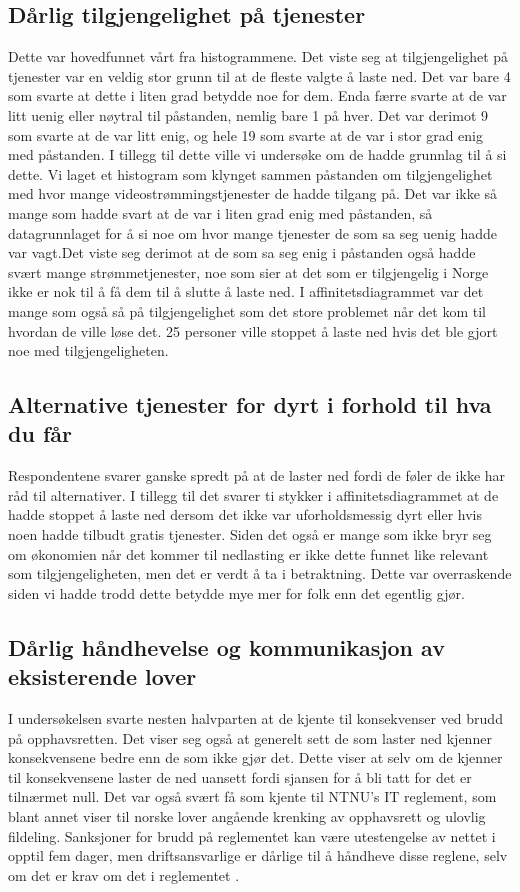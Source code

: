 \subsection{Dårlig tilgjengelighet på tjenester}
Dette var hovedfunnet vårt fra histogrammene. Det viste seg at tilgjengelighet på tjenester var en veldig stor grunn til at de fleste valgte å laste ned. Det var bare 4 som svarte at dette i liten grad betydde noe for dem. Enda færre svarte at de var litt uenig eller nøytral til påstanden, nemlig bare 1 på hver. Det var derimot 9 som svarte at de var litt enig, og hele 19 som svarte at de var i stor grad enig med påstanden. 
I tillegg til dette ville vi undersøke om de hadde grunnlag til å si dette. Vi laget et histogram som klynget sammen påstanden om tilgjengelighet med hvor mange videostrømmingstjenester de hadde tilgang på. Det var ikke så mange som hadde svart at de var i liten grad enig med påstanden, så datagrunnlaget for å si noe om hvor mange tjenester de som sa seg uenig hadde var vagt.Det viste seg derimot at de som sa seg enig i påstanden også hadde svært mange strømmetjenester, noe som sier at det som er tilgjengelig i Norge ikke er nok til å få dem til å slutte å laste ned. 
I affinitetsdiagrammet var det mange som også så på tilgjengelighet som det store problemet når det kom til hvordan de ville løse det. 25 personer ville stoppet å laste ned hvis det ble gjort noe med tilgjengeligheten. 

\subsection{Alternative tjenester for dyrt i forhold til hva du får}
Respondentene svarer ganske spredt på at de laster ned fordi de føler de ikke har råd til alternativer. I tillegg til det svarer ti stykker i affinitetsdiagrammet at de hadde stoppet å laste ned dersom det ikke var uforholdsmessig dyrt eller hvis noen hadde tilbudt gratis tjenester. Siden det også er mange som ikke bryr seg om økonomien når det kommer til nedlasting er ikke dette funnet like relevant som tilgjengeligheten, men det er verdt å ta i betraktning. Dette var overraskende siden vi hadde trodd dette betydde mye mer for folk enn det egentlig gjør. 

\subsection{Dårlig håndhevelse og kommunikasjon av eksisterende lover}
I undersøkelsen svarte nesten halvparten at de kjente til konsekvenser ved brudd på opphavsretten. Det viser seg også at generelt sett de som laster ned kjenner konsekvensene bedre enn de som ikke gjør det. Dette viser at selv om de kjenner til konsekvensene laster de ned uansett fordi sjansen for å bli tatt for det er tilnærmet null. Det var også svært få som kjente til NTNU's IT reglement, som blant annet viser til norske lover angående krenking av opphavsrett og ulovlig fildeling. Sanksjoner for brudd på reglementet kan være utestengelse av nettet i opptil fem dager, men driftsansvarlige er dårlige til å håndheve disse reglene, selv om det er krav om det i reglementet \cite{ITReg}. 
